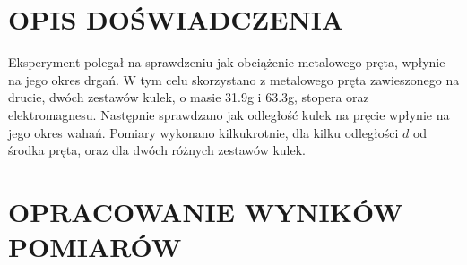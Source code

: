 \documentclass{article}
\begin{document}
\section*{OPIS DOŚWIADCZENIA}

{Eksperyment polegał na sprawdzeniu jak obciążenie metalowego pręta, wpłynie na jego okres drgań. W tym celu skorzystano z metalowego pręta zawieszonego na drucie, dwóch zestawów kulek, o masie 31.9g i 63.3g, stopera oraz elektromagnesu. Następnie sprawdzano jak odległość kulek na pręcie wpłynie na jego okres wahań. Pomiary wykonano kilkukrotnie, dla kilku odległości $d$ od środka pręta, oraz dla dwóch różnych zestawów kulek.} \\

\section*{OPRACOWANIE WYNIKÓW POMIARÓW}
\end{document}
